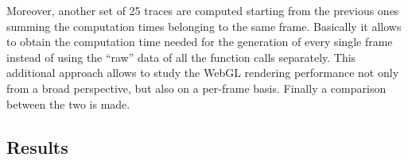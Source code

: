 Moreover, another set of 25 traces are computed starting from the previous ones
summing the computation times belonging to the same frame. Basically it allows
to obtain the computation time needed for the generation of every single frame
instead of using the ``raw'' data of all the function calls separately.
This additional approach allows to study the WebGL rendering performance not
only from a broad perspective, but also on a per-frame basis. Finally a comparison
between the two is made.


\subsection{Results}

